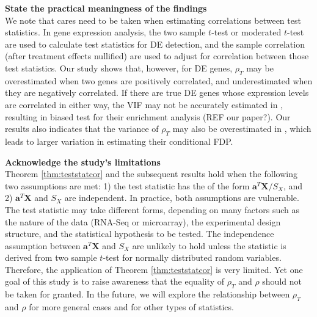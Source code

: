 \documentclass[12pt, a4paper]{article}
\begin{document}
	\textbf{State the practical meaningness of the findings}\\
	We note that cares need to be taken when estimating correlations between test statistics.
	In gene expression analysis, the two sample $t$-test \citep{barry2008statistical, 
	efron2007correlation,qiu2005correlation} or moderated 
	$t$-test \citep{wu2012camera} are used to calculate test statistics for DE detection, and the 
	sample correlation (after treatment effects 
	nullified) are used to adjust for correlation between those test statistics.
	Our study shows that, however, for DE genes, $\rho_T$ may be overestimated when
	two genes are positively correlated, and underestimated when they are negatively correlated. If 
	there are true DE genes whose expression 
	levels are correlated in either way, the VIF may not be accurately estimated in 
	\cite{wu2012camera}, resulting in biased test
	for their enrichment analysis (REF our paper?). Our results also indicates that the variance of 
	$\rho_T$ may also be overestimated in
	\cite{efron2007correlation}, which leads to larger variation in estimating their conditional 
	FDP.
	
	\textbf{	Acknowledge the study’s limitations \\}
	Theorem \ref{thm:teststatcor} and the subsequent results hold when the following two 
	assumptions are met: 1) the test statistic has the of 
	the form $\bm a^T\bm X/S_X$, and 2) $\bm a^T\bm X$ and $S_X$ are independent. In practice, both 
	assumptions are vulnerable.
	The test statistic may take different forms, depending on many factors such as the nature of 
	the data (RNA-Seq or microarray), the 
	experimental design structure, and the statistical hypothesis to be tested. The independence 
	assumption between $\bm a^T\bm X$ and $S_X$ are 
	unlikely to hold unless the statistic is derived from two sample $t$-test for normally 
	distributed random variables. Therefore, the 
	application of Theorem \ref{thm:teststatcor} is very limited. Yet one goal of this study is to 
	raise awareness that the equality of $\rho_T$ 
	and $\rho$ should not be taken for granted. In the future, we will explore the relationship 
	between $\rho_T$ and $\rho$ for more general cases and for other types of statistics. 
	
	
	
	\newpage

	
	
	
	
\end{document}
